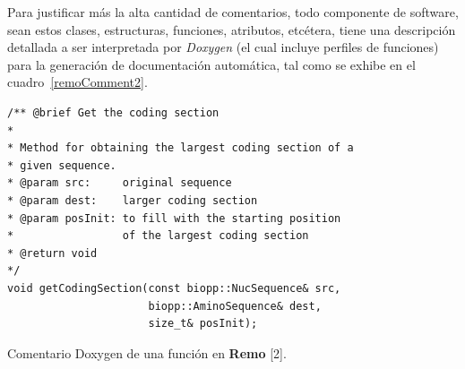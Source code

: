\par Para justificar más la alta cantidad de comentarios, todo componente de software, sean estos clases, estructuras, funciones, atributos, etcétera, tiene una descripción detallada a ser interpretada por \textit{Doxygen} (el cual incluye perfiles de funciones) para la generación de documentación automática, tal como se exhibe en el cuadro~\ref{remoComment2}.

\begin{table}[!h]
    \lstset{language=C++}
    \begin{lstlisting}[frame=single]
/** @brief Get the coding section
*
* Method for obtaining the largest coding section of a 
* given sequence.
* @param src:     original sequence
* @param dest:    larger coding section
* @param posInit: to fill with the starting position 
*                 of the largest coding section
* @return void
*/
void getCodingSection(const biopp::NucSequence& src, 
                      biopp::AminoSequence& dest, 
                      size_t& posInit);
    \end{lstlisting}
    \centering \caption{Comentario Doxygen de una función en \textbf{Remo} [2].}
    \label{remoComment2}
\end{table}
